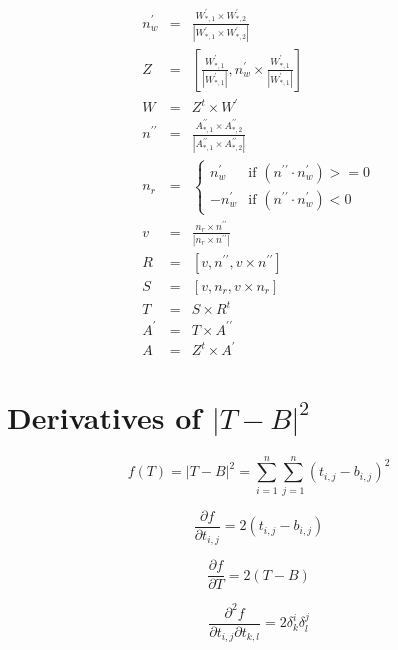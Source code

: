 \documentclass{report}
\begin{document}
\begin{eqnarray}
n^\prime_w &=& \frac{W^\prime_{*,1} \times W^\prime_{*,2}}
                   {|W^\prime_{*,1} \times W^\prime_{*,2}|} \\
Z &=& \left[ \frac{W^\prime_{*,1}}{|W^\prime_{*,1}|}, 
              n^\prime_w \times \frac{W^\prime_{*,1}}{|W^\prime_{*,1}|} \right] \\
W &=& Z^t \times W^\prime \\
n^{\prime\prime} &=& \frac{A^{\prime\prime}_{*,1} \times A^{\prime\prime}_{*,2}}
                       {|A^{\prime\prime}_{*,1} \times A^{\prime\prime}_{*,2}|} \\
n_r &=& \left\{ \begin{array}{ll} 
         n^\prime_w & \textrm{if $(n^{\prime\prime} \cdot n^\prime_w) >= 0$} \\
        -n^\prime_w & \textrm{if $(n^{\prime\prime} \cdot n^\prime_w) < 0$}
        \end{array} \right. \\
v &=& \frac{n_r \times n^{\prime\prime}}{|n_r \times n^{\prime\prime}|} \\
R &=& \left[ v, n^{\prime\prime}, v \times n^{\prime\prime} \right] \\
S &=& \left[ v, n_r, v \times n_r \right] \\
T &=& S \times R^t \\
A^\prime &=& T \times A^{\prime\prime} \\
A &=& Z^t \times A^\prime
\end{eqnarray}

\section{Derivatives of $|T-B|^2$}

\begin{equation}
f(T) = |T-B|^2 = \sum_{i=1}^n \sum_{j=1}^n (t_{i,j} - b_{i,j})^2
\end{equation}

\begin{equation}
\frac{\partial f}{\partial t_{i,j}} = 2 (t_{i,j} - b_{i,j})
\end{equation}

\begin{equation}
\frac{\partial f}{\partial T} = 2(T - B)
\end{equation}


\begin{equation}
\frac{\partial^2 f}{\partial t_{i,j} \partial t_{k,l}} = 2 \delta^i_k \delta^j_l \end{equation}
\end{document}
